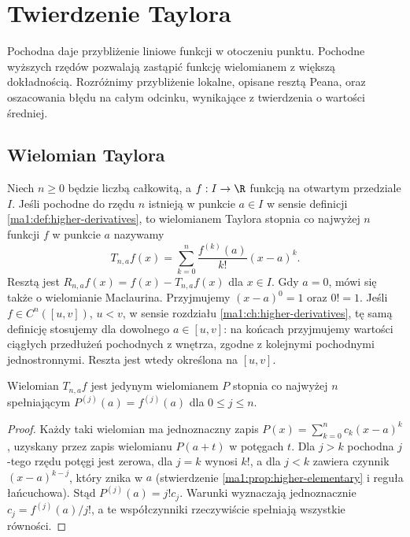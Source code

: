 \chapter{Twierdzenie Taylora}
\label{ma1:ch:taylor}

Pochodna daje przybliżenie liniowe funkcji w otoczeniu punktu. Pochodne wyższych rzędów pozwalają zastąpić funkcję wielomianem z większą dokładnością. Rozróżnimy przybliżenie lokalne, opisane resztą Peana, oraz oszacowania błędu na całym odcinku, wynikające z twierdzenia o wartości średniej.

\section{Wielomian Taylora}
\begin{definicja}
\label{ma1:def:taylor-polynomial}
Niech $n\ge0$ będzie liczbą całkowitą, a $f:I\to\R$ funkcją na otwartym przedziale $I$. Jeśli pochodne do rzędu $n$ istnieją w punkcie $a\in I$ w sensie definicji \ref{ma1:def:higher-derivatives}, to wielomianem Taylora stopnia co najwyżej $n$ funkcji $f$ w punkcie $a$ nazywamy
\[
 T_{n,a}f(x)=\sum_{k=0}^n\frac{f^{(k)}(a)}{k!}(x-a)^k.
\]
Resztą jest $R_{n,a}f(x)=f(x)-T_{n,a}f(x)$ dla $x\in I$. Gdy $a=0$, mówi się także o wielomianie Maclaurina. Przyjmujemy $(x-a)^0=1$ oraz $0!=1$. Jeśli $f\in C^n([u,v])$, $u<v$, w sensie rozdziału \ref{ma1:ch:higher-derivatives}, tę samą definicję stosujemy dla dowolnego $a\in[u,v]$: na końcach przyjmujemy wartości ciągłych przedłużeń pochodnych z wnętrza, zgodne z kolejnymi pochodnymi jednostronnymi. Reszta jest wtedy określona na $[u,v]$.
\end{definicja}
\begin{stwierdzenie}
\label{ma1:prop:taylor-jet}
Wielomian $T_{n,a}f$ jest jedynym wielomianem $P$ stopnia co najwyżej $n$ spełniającym $P^{(j)}(a)=f^{(j)}(a)$ dla $0\le j\le n$.
\end{stwierdzenie}
\begin{proof}
Każdy taki wielomian ma jednoznaczny zapis $P(x)=\sum_{k=0}^n c_k(x-a)^k$, uzyskany przez zapis wielomianu $P(a+t)$ w potęgach $t$. Dla $j>k$ pochodna $j$-tego rzędu potęgi jest zerowa, dla $j=k$ wynosi $k!$, a dla $j<k$ zawiera czynnik $(x-a)^{k-j}$, który znika w $a$ (stwierdzenie \ref{ma1:prop:higher-elementary} i reguła łańcuchowa). Stąd $P^{(j)}(a)=j!c_j$. Warunki wyznaczają jednoznacznie $c_j=f^{(j)}(a)/j!$, a te współczynniki rzeczywiście spełniają wszystkie równości.
\end{proof}

